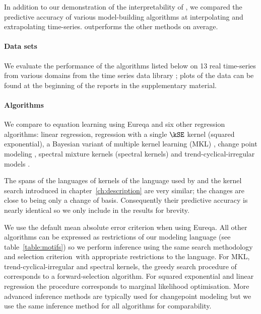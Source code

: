 In addition to our demonstration of the interpretability of \procedurename{}, we compared the predictive accuracy of various model-building algorithms at interpolating and extrapolating time-series.
\procedurename{} outperforms the other methods on average.

\paragraph{Data sets}

We evaluate the performance of the algorithms listed below on 13 real time-series from various domains from the time series data library \citep{Hyndman_undated-zj}; plots of the data can be found at the beginning of the reports in the supplementary material.

\paragraph{Algorithms}

We compare \procedurename{} to equation learning using Eureqa \citep{Nutonian2011-el} and six other regression algorithms: linear regression, \gp{} regression with a single $\kSE$ kernel (squared exponential), a Bayesian variant of multiple kernel learning (MKL) \citep[e.g.][]{Bach2004-lb}, change point modeling \citep[e.g.][]{Garnett2010-rd, Saatci2010-el, Fox2012-fm}, spectral mixture kernels \citep{Wilson2013-eq} (spectral kernels) and trend-cyclical-irregular models \citep[e.g.][]{Lind2006-th}.

The spans of the languages of kernels of the language used by \procedurename{} and the kernel search introduced in chapter~\ref{ch:description} are very similar; the changes are close to being only a change of basis.
Consequently their predictive accuracy is nearly identical so we only include \procedurename{} in the results for brevity.

We use the default mean absolute error criterion when using Eureqa.
All other algorithms can be expressed as restrictions of our modeling language (see table~\ref{table:motifs}) so we perform inference using the same search methodology and selection criterion\footnotemark~with appropriate restrictions to the language.
For MKL, trend-cyclical-irregular and spectral kernels, the greedy search procedure of \procedurename{} corresponds to a forward-selection algorithm.
For squared exponential and linear regression the procedure corresponds to marginal likelihood optimisation.
More advanced inference methods are typically used for changepoint modeling but we use the same inference method for all algorithms for comparability.

